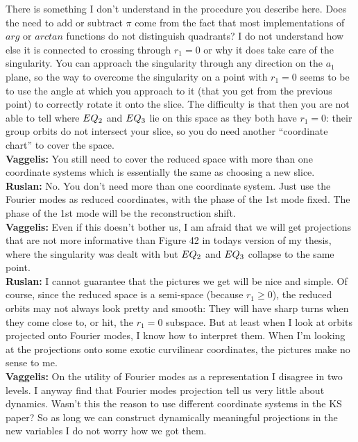 There is something I don't understand in the procedure you
describe here. Does the need to add or subtract $\pi$ come
from the fact that most implementations of $arg$ or $arctan$
functions do not distinguish quadrants? I do not understand
how else it is connected to crossing through $r_1 = 0$ or why
it does take care of the singularity. You can approach the
singularity through any direction on the $a_1$ plane, so the
way to overcome the singularity on a point with $r_1=0$ seems
to be to use the angle at which you approach to it (that you
get from the previous point) to correctly rotate it onto the
slice. The difficulty is that then you are not able to tell
where $EQ_{2}$ and $EQ_{3}$ lie on this space as they both
have $r_1=0$: their group orbits do not intersect your slice,
so you do need another ``coordinate chart'' to cover the
space.
\\
{\bf Vaggelis:} You still need to cover the reduced space
with more than one coordinate systems which is essentially
the same as choosing a new slice.\\
{\bf Ruslan:} No. You don't need more than one coordinate
system.  Just use the Fourier modes as reduced coordinates,
with the phase of the 1st mode fixed.  The phase of the 1st
mode will be the reconstruction shift.\\
{\bf Vaggelis:} Even if this doesn't bother us, I am afraid
that we will get projections that are not more informative
than Figure 42 in todays version of my thesis, where the
singularity was dealt with but $EQ_{2}$ and $EQ_{3}$
collapse to the same point.\\
{\bf Ruslan:} I cannot guarantee that the pictures we get
will be nice and simple.  Of course, since the reduced space
is a semi-space (because $r_1 \geq 0$), the reduced orbits
may not always look pretty and smooth: They will have sharp
turns when they come close to, or hit, the $r_1 = 0$
subspace.  But at least when I look at orbits projected onto
Fourier modes, I know how to interpret them.  When I'm
looking at the projections onto some exotic curvilinear
coordinates, the pictures make no sense to me.\\
{\bf Vaggelis:} On the utility of Fourier modes as a
representation I disagree in two levels. I anyway find that
Fourier modes projection tell us very little about dynamics.
Wasn't this the reason to use different coordinate systems in
the KS paper? So as long we can construct dynamically
meaningful projections in the new variables I do not worry
how we got them.

